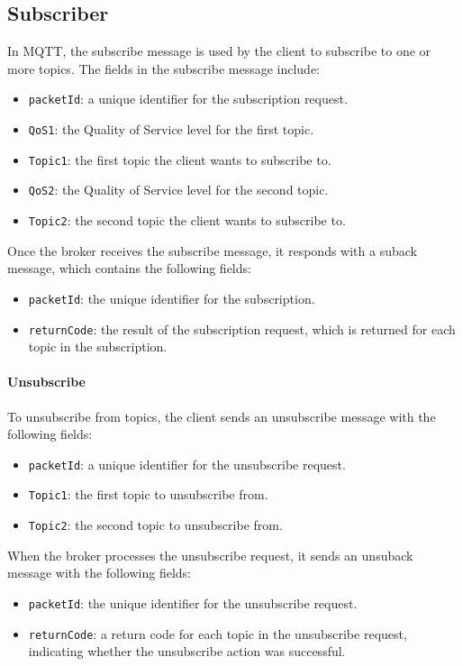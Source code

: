 \subsection{Subscriber}
In MQTT, the subscribe message is used by the client to subscribe to one or more topics. 
The fields in the subscribe message include:
\begin{itemize}
    \item \texttt{packetId}: a unique identifier for the subscription request.   
    \item \texttt{QoS1}: the Quality of Service level for the first topic.   
    \item \texttt{Topic1}: the first topic the client wants to subscribe to.  
    \item \texttt{QoS2}: the Quality of Service level for the second topic.
    \item \texttt{Topic2}: the second topic the client wants to subscribe to.
\end{itemize}
\noindent Once the broker receives the subscribe message, it responds with a suback message, which contains the following fields:
\begin{itemize}
    \item \texttt{packetId}: the unique identifier for the subscription.
    \item \texttt{returnCode}: the result of the subscription request, which is returned for each topic in the subscription.
\end{itemize}

\paragraph*{Unsubscribe}
To unsubscribe from topics, the client sends an unsubscribe message with the following fields:
\begin{itemize}
    \item \texttt{packetId}: a unique identifier for the unsubscribe request.
    \item \texttt{Topic1}: the first topic to unsubscribe from.
    \item \texttt{Topic2}: the second topic to unsubscribe from.
\end{itemize}
\noindent When the broker processes the unsubscribe request, it sends an unsuback message with the following fields:
\begin{itemize}
    \item \texttt{packetId}: the unique identifier for the unsubscribe request.
    \item \texttt{returnCode}: a return code for each topic in the unsubscribe request, indicating whether the unsubscribe action was successful.
\end{itemize}

